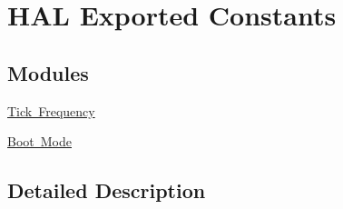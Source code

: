 \hypertarget{group___h_a_l___exported___constants}{}\section{H\+AL Exported Constants}
\label{group___h_a_l___exported___constants}
\subsection*{Modules}
\begin{DoxyCompactItemize}
\item 
\mbox{\hyperlink{group___h_a_l___t_i_c_k___f_r_e_q}{Tick Frequency}}
\item 
\mbox{\hyperlink{group___s_y_s_c_f_g___boot_mode}{Boot Mode}}
\end{DoxyCompactItemize}


\subsection{Detailed Description}
